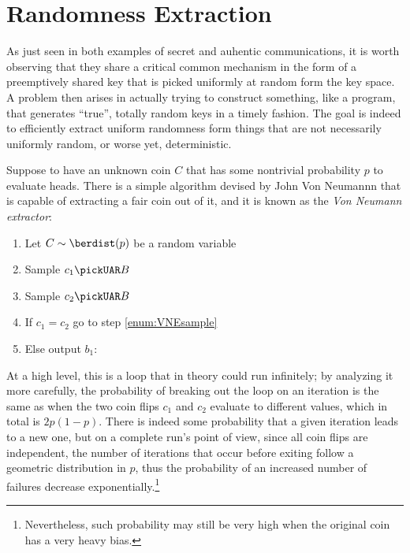 
\newcommand{\Extm}{\textup{\textsf{Ext}}}
\newcommand{\Extf}{\textrm{\textup{Ext}}}
\newcommand{\statdist}{\ensuremath{\Delta_\textsc{s}}}
\newcommand{\sdtu}{\ensuremath{\Delta_\textsc{u}}}

\section{Randomness Extraction}

As just seen in both examples of secret and auhentic communications, it is worth observing that they share a critical common mechanism in the form of a preemptively shared key that is picked uniformly at random form the key space. A problem then arises in actually trying to construct something, like a program, that generates ``true'', totally random keys in a timely fashion. The goal is indeed to efficiently extract uniform randomness form things that are not necessarily uniformly random, or worse yet, deterministic.

Suppose to have an unknown coin $C$ that has some nontrivial probability $p$ to evaluate heads. There is a simple algorithm devised by John Von Neumannn that is capable of extracting a fair coin out of it, and it is known as the \emph{Von Neumann extractor}:

\begin{enumerate}
    \item Let $C \sim \berdist(p)$ be a random variable
    \item \label{enum:VNEsample} Sample $c_1 \pickUAR B$
    \item Sample $c_2 \pickUAR B$
    \item If $c_1 = c_2$ go to step \ref{enum:VNEsample}
    \item \label{enum:VNEreturn} Else output $b_1$:
\end{enumerate}

At a high level, this is a loop that in theory could run infinitely; by analyzing it more carefully, the probability of breaking out the loop on an iteration is the same as when the two coin flips $c_1$ and $c_2$ evaluate to different values, which in total is $2p(1 - p)$. There is indeed some probability that a given iteration leads to a new one, but on a complete run's point of view, since all coin flips are independent, the number of iterations that occur before exiting follow a  geometric distribution in $p$, thus the probability of an increased number of failures decrease exponentially.\footnote{Nevertheless, such probability may still be very high when the original coin has a very heavy bias.}

